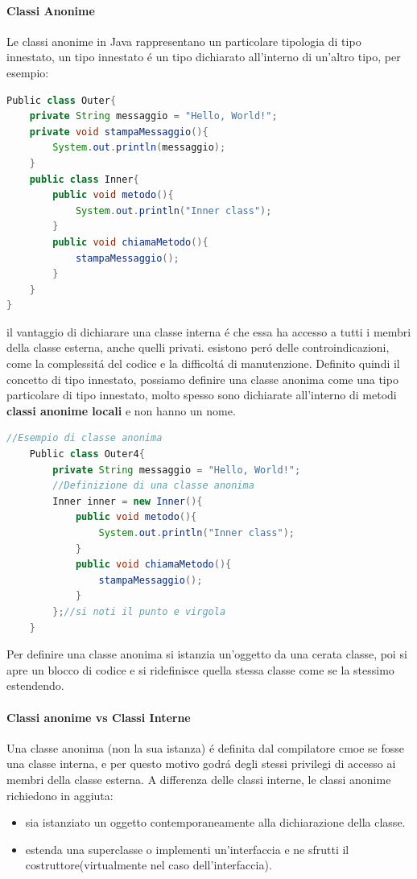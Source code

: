 \documentclass[11pt]{article}
\begin{document}
\paragraph{Classi Anonime}
Le classi anonime in Java rappresentano un particolare tipologia di tipo innestato, un tipo innestato é un tipo dichiarato all'interno di un'altro tipo, per esempio:
\begin{lstlisting}[language=Java]
Public class Outer{
    private String messaggio = "Hello, World!";
    private void stampaMessaggio(){
        System.out.println(messaggio);
    }
    public class Inner{
        public void metodo(){
            System.out.println("Inner class");
        }
        public void chiamaMetodo(){
            stampaMessaggio();
        }
    }
}
\end{lstlisting}
il vantaggio di dichiarare una classe interna é che essa ha accesso a tutti i membri della classe esterna, anche quelli privati.
esistono peró delle controindicazioni, come la complessitá del codice e la difficoltá di manutenzione.
Definito quindi il concetto di tipo innestato, possiamo definire una classe anonima come una tipo particolare di tipo innestato, molto spesso sono dichiarate all'interno di metodi \textbf{classi anonime locali} e non hanno un nome.
\begin{lstlisting}[language=Java]
    //Esempio di classe anonima
    Public class Outer4{
        private String messaggio = "Hello, World!";
        //Definizione di una classe anonima
        Inner inner = new Inner(){
            public void metodo(){
                System.out.println("Inner class");
            }
            public void chiamaMetodo(){
                stampaMessaggio();
            }
        };//si noti il punto e virgola
    }
\end{lstlisting}
Per definire una classe anonima si istanzia un'oggetto da una cerata classe, poi si apre un blocco di codice e si ridefinisce quella stessa classe come se la  stessimo estendendo.
\paragraph{Classi anonime vs Classi Interne}
Una classe anonima (non la sua istanza) é definita dal compilatore cmoe se fosse una classe interna, e per questo motivo godrá degli stessi privilegi di accesso ai membri della classe esterna.
A differenza delle classi interne, le classi anonime richiedono in aggiuta:
\begin{itemize}
    \item sia istanziato un oggetto contemporaneamente alla dichiarazione della classe.
    \item estenda una superclasse o implementi un'interfaccia e ne sfrutti il costruttore(virtualmente nel caso dell'interfaccia).
    \end{itemize}
\end{document}
